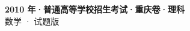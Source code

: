 \documentclass[zihao=-4, a4paper]{ctexart}
\begin{document}
\begin{center}
  {\Large\bfseries 2010 年·普通高等学校招生考试·重庆卷·理科}\\[4pt]
  {\large 数学 · 试题版}
\end{center}
\medskip
{}

\end{document}

